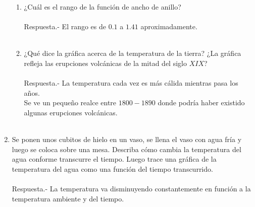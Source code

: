 \begin{enumerate}
	\begin{enumerate}[\bfseries (a)]

	    \item ¿Cuál es el rango de la función de ancho de anillo?\\\\
		Respuesta.-\; El rango es de $0.1$ a $1.41$ aproximadamente.\\\\

	    \item ¿Qué dice la gráfica acerca de la temperatura de la tierra? ¿La gráfica refleja las erupciones volcánicas de la mitad del siglo $XIX$?\\\\
		Respuesta.-\; La temperatura cada vez es más cálida mientras pasa los años. \\
		Se ve un pequeño realce entre $1800-1890$ donde podría haber existido algunas erupciones volcánicas.\\\\

	\end{enumerate}

    \item Se ponen unos cubitos de hielo en un vaso, se llena el vaso con agua fría y luego se coloca sobre una mesa. Describa cómo cambia la temperatura del agua conforme transcurre el tiempo. Luego trace una gráfica de la temperatura del agua como una función del tiempo transcurrido.\\\\
    Respuesta.-\; La temperatura va disminuyendo constantemente en función a la temperatura ambiente y del tiempo.

            \begin{center}
            \end{center}  


\end{enumerate}
